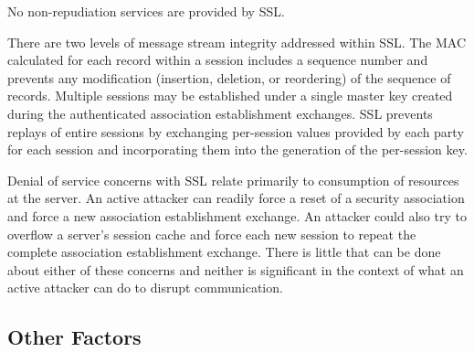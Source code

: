   
  No non-repudiation services are provided by SSL.

  
  There are two levels of message stream integrity addressed within SSL.
  The MAC calculated for each record within a session includes a sequence
  number and prevents any modification (insertion, deletion, or reordering)
  of the sequence of records. Multiple sessions may be established under a
  single master key created during the authenticated association
  establishment exchanges. SSL prevents replays of entire sessions by
  exchanging per-session values provided by each party for each session and
  incorporating them into the generation of the per-session key.

  
  Denial of service concerns with SSL relate primarily to consumption of
  resources at the server. An active attacker can readily force a reset of
  a security association and force a new association establishment
  exchange. An attacker could also try to overflow a server's session cache
  and force each new session to repeat the complete association
  establishment exchange. There is little that can be done about either of
  these concerns and neither is significant in the context of what an
  active attacker can do to disrupt communication.
\latexhtml{\end{itemize}}{\end{htmllist}}


\subsection{Other Factors}


  
